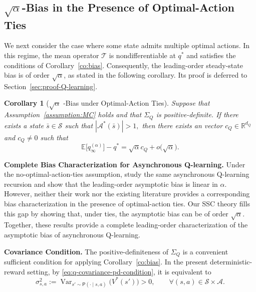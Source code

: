 \documentclass[11pt,letterpaper]{article}
\theoremstyle{plain}
\newtheorem{corollary}{Corollary}
\theoremstyle{definition}
\theoremstyle{remark}
\newcommand{\E}{\mathbb{E}}
\newcommand{\mS}{\mathcal{S}}
\newcommand{\mA}{\mathcal{A}}
\newcommand{\mT}{\mathcal{T}}
\newcommand{\R}{\mathbb{R}}
\begin{document}
\subsection{\texorpdfstring{$\sqrt{\alpha}$}{sqrt(alpha)}-Bias in the Presence of Optimal-Action Ties}
\label{sec:q-ties}

We next consider the case where some state admits multiple optimal actions.
In this regime, the mean operator \(\mT\) is nondifferentiable at \(q^*\) and
satisfies the conditions of Corollary~\ref{co:bias}. Consequently, the
leading-order steady-state bias is of order \(\sqrt{\alpha}\), as stated in
the following corollary. Its proof is deferred to
Section~\ref{sec:proof-Q-learning}.

\begin{corollary}[\(\sqrt{\alpha}\) -Bias under Optimal-Action Ties]
\label{cor:q-learning-nonsmooth-bias}
Suppose that Assumption~\ref{assumption:MC} holds and that $\Sigma_Q$ is positive-definite.  If there exists a state \(\bar s\in\mS\) such that $|\mA^*(\bar s)|>1,$ then there exists an vector \(c_Q\in \R^{d_Q}\) and $c_Q \neq 0$ such that
\begin{equation*}
    \E\bigl[q_\infty^{(\alpha)}\bigr]-q^*
    =
    \sqrt{\alpha} c_Q 
    +
    o\bigl(\sqrt{\alpha}\bigr).
\end{equation*}
\end{corollary}


\noindent\textbf{Complete Bias Characterization for Asynchronous Q-learning.}
Under the no-optimal-action-ties assumption, \cite{zhang2024constant} study
the same asynchronous Q-learning recursion and show that the leading-order
asymptotic bias is linear in \(\alpha\). However, neither their work nor the
existing literature provides a corresponding bias characterization in the
presence of optimal-action ties. Our SSC theory fills this gap by showing
that, under ties, the asymptotic bias can be of order \(\sqrt{\alpha}\). Together, these results provide a complete leading-order characterization of
the asymptotic bias of asynchronous Q-learning.

\noindent\textbf{Covariance Condition.}
The positive-definiteness of \(\Sigma_Q\) is a convenient sufficient
condition for applying Corollary~\ref{co:bias}. In the present
deterministic-reward setting, by \eqref{eq:q-covariance-pd-condition}, it is equivalent to
\[
    \sigma_{s,a}^2
    :=
    \operatorname{Var}_{s'\sim\mathsf P(\cdot\mid s,a)}
    \bigl(V^*(s')\bigr)
    >0,
    \qquad
    \forall (s,a)\in\mS\times\mA.
\]
\end{document}
